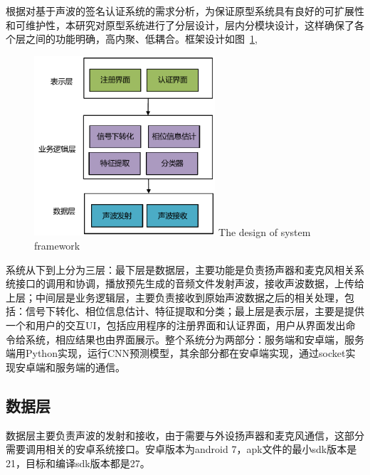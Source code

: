 根据对基于声波的签名认证系统的需求分析，为保证原型系统具有良好的可扩展性和可维护性，本研究对原型系统进行了分层设计，层内分模块设计，这样确保了各个层之间的功能明确，高内聚、低耦合。框架设计如图~\ref{fig:system-framework},
\begin{figure}
  \centering
  \includegraphics[width=0.6\textwidth]{figure/prototype-architecture.pdf}
      {The design of system framework}
  \label{fig:system-framework}
\end{figure}
系统从下到上分为三层：最下层是数据层，主要功能是负责扬声器和麦克风相关系统接口的调用和协调，播放预先生成的音频文件发射声波，接收声波数据，上传给上层；中间层是业务逻辑层，主要负责接收到原始声波数据之后的相关处理，包括：信号下转化、相位信息估计、特征提取和分类；最上层是表示层，主要是提供一个和用户的交互UI，包括应用程序的注册界面和认证界面，用户从界面发出命令给系统，相应结果也由界面展示。整个系统分为两部分：服务端和安卓端，服务端用Python实现，运行CNN预测模型，其余部分都在安卓端实现，通过socket实现安卓端和服务端的通信。 


\subsection{数据层}
数据层主要负责声波的发射和接收，由于需要与外设扬声器和麦克风通信，这部分需要调用相关的安卓系统接口。安卓版本为android 7，apk文件的最小sdk版本是21，目标和编译sdk版本都是27。

